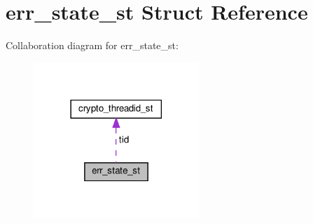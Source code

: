 \hypertarget{structerr__state__st}{}\section{err\+\_\+state\+\_\+st Struct Reference}
\label{structerr__state__st}


Collaboration diagram for err\+\_\+state\+\_\+st\+:
\nopagebreak
\begin{figure}[H]
\begin{center}
\leavevmode
\includegraphics[width=177pt]{structerr__state__st__coll__graph}
\end{center}
\end{figure}
